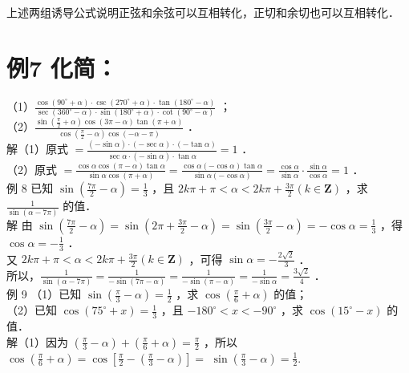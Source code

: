 \documentclass[10pt]{article}
\begin{document}
上述两组诱导公式说明正弦和余弦可以互相转化，正切和余切也可以互相转化．

\section*{例7 化简：}
（1）\(\frac{\cos \left(90^{\circ}+\alpha\right) \cdot \csc \left(270^{\circ}+\alpha\right) \cdot \tan \left(180^{\circ}-\alpha\right)}{\sec \left(360^{\circ}-\alpha\right) \cdot \sin \left(180^{\circ}+\alpha\right) \cdot \cot \left(90^{\circ}-\alpha\right)}\) ；\\
（2）\(\frac{\sin \left(\frac{\pi}{2}+\alpha\right) \cos (3 \pi-\alpha) \tan (\pi+\alpha)}{\cos \left(\frac{\pi}{2}-\alpha\right) \cos (-\alpha-\pi)}\) ．\\
解（1）原式 \(=\frac{(-\sin \alpha) \cdot(-\sec \alpha) \cdot(-\tan \alpha)}{\sec \alpha \cdot(-\sin \alpha) \cdot \tan \alpha}=1\) ．\\
（2）原式 \(=\frac{\cos \alpha \cos (\pi-\alpha) \tan \alpha}{\sin \alpha \cos (\pi+\alpha)}=\frac{\cos \alpha(-\cos \alpha) \tan \alpha}{\sin \alpha(-\cos \alpha)}=\frac{\cos \alpha}{\sin \alpha} \cdot \frac{\sin \alpha}{\cos \alpha}=1\) ．\\
例 8 已知 \(\sin \left(\frac{7 \pi}{2}-\alpha\right)=\frac{1}{3}\) ，且 \(2 k \pi+\pi<\alpha<2 k \pi+\frac{3 \pi}{2}(k \in \mathbf{Z})\) ，求 \(\frac{1}{\sin (\alpha-7 \pi)}\) 的值．\\
解 由 \(\sin \left(\frac{7 \pi}{2}-\alpha\right)=\sin \left(2 \pi+\frac{3 \pi}{2}-\alpha\right)=\sin \left(\frac{3 \pi}{2}-\alpha\right)=-\cos \alpha=\frac{1}{3}\) ，得 \(\cos \alpha=-\frac{1}{3}\) ．\\
又 \(2 k \pi+\pi<\alpha<2 k \pi+\frac{3 \pi}{2}(k \in \mathbf{Z})\) ，可得 \(\sin \alpha=-\frac{2 \sqrt{2}}{3}\) ．\\
所以，\(\frac{1}{\sin (\alpha-7 \pi)}=\frac{1}{-\sin (7 \pi-\alpha)}=\frac{1}{-\sin (\pi-\alpha)}=\frac{1}{-\sin \alpha}=\frac{3 \sqrt{2}}{4}\) ．\\
例 9 （1）已知 \(\sin \left(\frac{\pi}{3}-\alpha\right)=\frac{1}{2}\) ，求 \(\cos \left(\frac{\pi}{6}+\alpha\right)\) 的值；\\
（2）已知 \(\cos \left(75^{\circ}+x\right)=\frac{1}{3}\) ，且 \(-180^{\circ}<x<-90^{\circ}\) ，求 \(\cos \left(15^{\circ}-x\right)\) 的值．\\
解（1）因为 \(\left(\frac{\pi}{3}-\alpha\right)+\left(\frac{\pi}{6}+\alpha\right)=\frac{\pi}{2}\) ，所以 \(\cos \left(\frac{\pi}{6}+\alpha\right)=\cos \left[\frac{\pi}{2}-\left(\frac{\pi}{3}-\alpha\right)\right]=\) \(\sin \left(\frac{\pi}{3}-\alpha\right)=\frac{1}{2}\).\\
\end{document}
